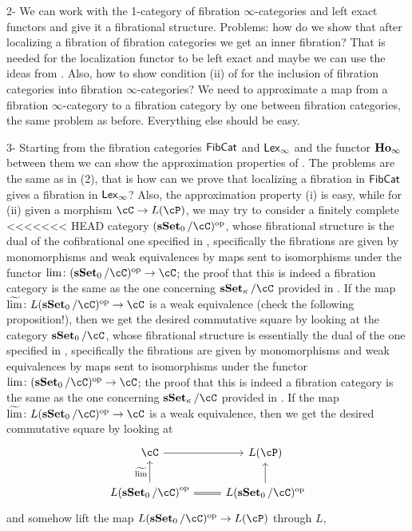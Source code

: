 \documentclass[a4paper,12pt]{scrartcl}
\begin{document}
2- We can work with the 1-category of fibration $\infty$-categories and left
exact functors and give it a fibrational structure. Problems: how do we show
that after localizing a fibration of fibration categories we get an inner
fibration? That is needed for the localization functor to be left exact and
maybe we can use the ideas from \cite[Prop.\ 3.5]{Szu17b}. Also, how to show
condition (ii) of \cite[Thm.\ 7.6.15]{Cis19} for the inclusion of fibration
categories into fibration $\infty$-categories? We need to approximate a map from
a fibration $\infty$-category to a fibration category by one between fibration
categories, the same problem as before. Everything else should be easy.

3- Starting from the fibration categories $\operatorname{\mathsf{FibCat}}$ and $\operatorname{\mathsf{Lex}_\infty}$ and the functor
$\operatorname{\mathbf{Ho}_\infty}$ between them we can show the approximation properties of \cite[Thm.\
7.6.15]{Cis19}. The problems are the same as in (2), that is  how can we prove
that localizing a fibration in $\operatorname{\mathsf{FibCat}}$ gives a fibration in $\operatorname{\mathsf{Lex}_\infty}$? Also, the
approximation property (i) is easy, while for (ii) given a morphism
$\cC\rightarrow L(\cP)$, we may try to consider a finitely complete
<<<<<<< HEAD
category $(\sSet_0/\cC)^{\op}$, whose fibrational structure is the dual of
the cofibrational one specified in \cite[Def.\ 4.1]{Szu17b}, specifically the
fibrations are given by monomorphisms and weak equivalences by maps sent to
isomorphisms under the functor $\lim\colon(\sSet_0/\cC)^{\op}\rightarrow\cC$;
the proof that this is indeed a fibration category is the same as the one
concerning $\sSet_\kappa/\cC$ provided in \cite[Prop.\ 4.2]{Szu17b}. If the map
$\widetilde{\lim}\colon L(\sSet_0/\cC)^{\op}\rightarrow\cC$ is a weak
equivalence (check the following proposition!), then we get the desired
commutative square by looking at the category $\sSet_0/\cC$, whose fibrational
structure is essentially the dual of
the one specified in \cite[Def.\ 4.1]{Szu17b}, specifically the fibrations are
given by monomorphisms and weak equivalences by maps sent to isomorphisms under
the functor $\lim\colon(\sSet_0/\cC)^{\op}\rightarrow\cC$; the proof that this
is indeed a fibration category is the same as the one concerning
$\sSet_\kappa/\cC$ provided in \cite[Prop.\ 4.2]{Szu17b}. If the map
$\widetilde{\lim}\colon L(\sSet_0/\cC)^{\op}\rightarrow\cC$ is a weak equivalence,
then we get the desired commutative square by looking at
\[\begin{tikzcd}
	\cC & {L(\cP)} \\
  {L(\sSet_0/\cC)}^{\op} & {L(\sSet_0/\cC)^{\op}}
	\arrow[from=2-2, to=1-2]
	\arrow[from=1-1, to=1-2]
  \arrow["\widetilde{\lim}", from=2-1, to=1-1]
	\arrow[Rightarrow, no head, from=2-1, to=2-2]
\end{tikzcd}\]
and somehow lift the map $L(\sSet_0/\cC)^{\op}\rightarrow L(\cP)$ through $L$,
\end{document}

